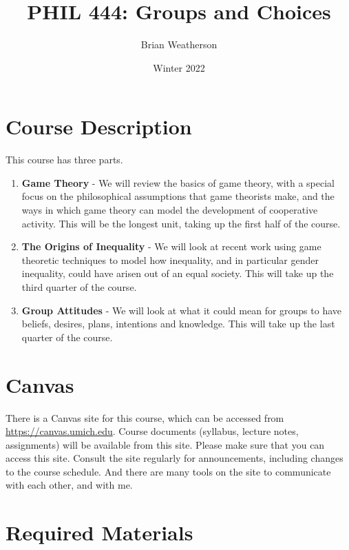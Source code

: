 \documentclass[
]{article}
\title{PHIL 444: Groups and Choices}
\author{Brian Weatherson}
\date{Winter 2022}
\providecommand{\tightlist}{%
  \setlength{\itemsep}{0pt}\setlength{\parskip}{0pt}}
\begin{document}
\maketitle

\hypertarget{course-description}{%
\section{Course Description}\label{course-description}}

This course has three parts.

\begin{enumerate}
\def\labelenumi{\arabic{enumi}.}
\tightlist
\item
  \textbf{Game Theory} - We will review the basics of game theory, with
  a special focus on the philosophical assumptions that game theorists
  make, and the ways in which game theory can model the development of
  cooperative activity. This will be the longest unit, taking up the
  first half of the course.
\item
  \textbf{The Origins of Inequality} - We will look at recent work using
  game theoretic techniques to model how inequality, and in particular
  gender inequality, could have arisen out of an equal society. This
  will take up the third quarter of the course.
\item
  \textbf{Group Attitudes} - We will look at what it could mean for
  groups to have beliefs, desires, plans, intentions and knowledge. This
  will take up the last quarter of the course.
\end{enumerate}

\hypertarget{canvas}{%
\section{Canvas}\label{canvas}}

There is a Canvas site for this course, which can be accessed from
\url{https://canvas.umich.edu}. Course documents (syllabus, lecture
notes, assignments) will be available from this site. Please make sure
that you can access this site. Consult the site regularly for
announcements, including changes to the course schedule. And there are
many tools on the site to communicate with each other, and with me.

\hypertarget{required-materials}{%
\section{Required Materials}\label{required-materials}}
\end{document}
